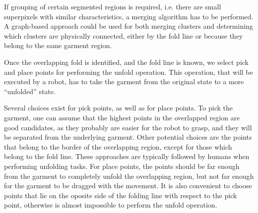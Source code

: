 If grouping of certain segmented regions is required, i.e. there are small superpixels with similar characteristics, a merging algorithm has to be performed. A graph-based approach could be used for both merging clusters and determining which clusters are physically connected, either by the fold line or because they belong to the same garment region.


Once the overlapping fold is identified, and the fold line is known, we select pick and place points for performing the unfold operation. This operation, that will be executed by a robot, has to take the garment from the original state to a more ``unfolded'' state.

Several choices exist for pick points, as well as for place points. To pick the garment, one can assume that the highest points in the overlapped region are good candidates, as they probably are easier for the robot to grasp, and they will be separated from the underlying garment. Other potential choices are the points that belong to the border of the overlapping region, except for those which belong to the fold line. These approaches are typically followed by humans when performing unfolding tasks. For place points, the points should be far enough from the garment to completely unfold the overlapping region, but not far enough for the garment to be dragged with the movement. It is also convenient to choose points that lie on the oposite side of the folding line with respect to the pick point, otherwise is almost impossible to perform the unfold operation.
